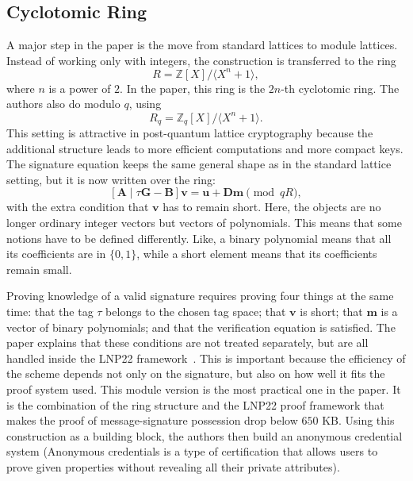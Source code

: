\documentclass[a4paper]{article}
\begin{document}
\subsection{Cyclotomic Ring}

A major step in the paper is the move from standard lattices to module lattices. Instead of working only with integers, the construction is transferred to the ring
\[R=\mathbb{Z}[X]/\langle X^n+1\rangle,\]
where \(n\) is a power of \(2\). In the paper, this ring is the $2n$-th cyclotomic ring. The authors also do modulo \(q\), using\[R_q=\mathbb{Z}_q[X]/\langle X^n+1\rangle.\]
This setting is attractive in post-quantum lattice cryptography because the additional structure leads to more efficient computations and more compact keys.
The signature equation keeps the same general shape as in the standard lattice setting, but it is now written over the ring:
\[[\mathbf{A}\mid \tau \mathbf{G}-\mathbf{B}]\mathbf{v}
= \mathbf{u}+\mathbf{D}\mathbf{m} \pmod{qR},\]
with the extra condition that \(\mathbf{v}\) has to remain short.
Here, the objects are no longer ordinary integer vectors but vectors of polynomials. This means that some notions have to be defined differently. Like, a binary polynomial means that all its coefficients are in \(\{0,1\}\), while a short element means that its coefficients remain small. 

Proving knowledge of a valid signature requires proving four things at the same time: that the tag \(\tau\) belongs to the chosen tag space; that \(\mathbf{v}\) is short; that \(\mathbf{m}\) is a vector of binary polynomials; and that the verification equation is satisfied.
The paper explains that these conditions are not treated separately, but are all handled inside the LNP22 framework~\cite{LNP22}. This is important because the efficiency of the scheme depends not only on the signature, but also on how well it fits the proof system used.
This module version is the most practical one in the paper. It is the combination of the ring structure and the LNP22 proof framework that makes the proof of message-signature possession drop below \(650\) KB. Using this construction as a building block, the authors then build an anonymous credential system
(Anonymous credentials is a type of certification that allows users to prove given properties without revealing all their private attributes). 
\end{document}
